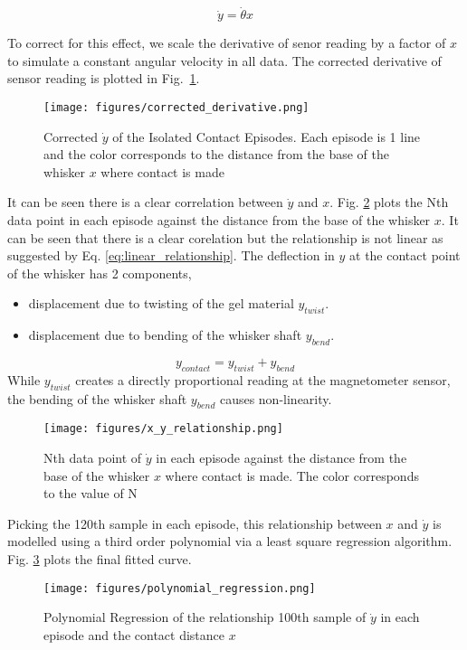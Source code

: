\documentclass{report}
\begin{document}
\[\dot{y} = \dot{\theta}x\]\label{eq:linear_relationship}

To correct for this effect, we scale the derivative of senor reading by a factor of \(x\) to simulate a constant angular velocity in all data. The corrected derivative of sensor reading is plotted in Fig.~\ref{fig:corrected_derivative.png}.

\begin{figure}[H]
    \centering
    \texttt{[image: figures/corrected\_derivative.png]}
    \caption{Corrected \(\dot{y}\) of the Isolated Contact Episodes. Each episode is 1 line and the color corresponds to the distance from the base of the whisker \(x\) where contact is made}
    \label{fig:corrected_derivative.png}
\end{figure}

It can be seen there is a clear correlation between \(\dot{y}\) and \(x\). Fig. \ref*{fig:x_y_relationship.png} plots the Nth data point in each episode against the distance from the base of the whisker \(x\). It can be seen that there is a clear corelation but the relationship is not linear as suggested by Eq. \ref*{eq:linear_relationship}. The deflection in \(y\) at the contact point of the whisker has 2 components,
\begin{itemize}
    \item displacement due to twisting of the gel material \(y_{twist}\).
    \item displacement due to bending of the whisker shaft \(y_{bend}\).
\end{itemize}
\[y_{contact} = y_{twist} + y_{bend}\]
While \(y_{twist}\) creates a directly proportional reading at the magnetometer sensor, the bending of the whisker shaft \(y_{bend}\) causes non-linearity.

\begin{figure}[H]
    \centering
    \texttt{[image: figures/x\_y\_relationship.png]}
    \caption{Nth data point of \(\dot{y}\) in each episode against the distance from the base of the whisker \(x\) where contact is made. The color corresponds to the value of N}
    \label{fig:x_y_relationship.png}
\end{figure}


Picking the 120th sample in each episode, this relationship between \(x\) and \(\dot{y}\) is modelled using a third order polynomial via a least square regression algorithm. Fig. \ref*{fig:polynomial_regression.png} plots the final fitted curve.

\begin{figure}[H]
    \centering
    \texttt{[image: figures/polynomial\_regression.png]}
    \caption{Polynomial Regression of the relationship 100th sample of \(\dot{y}\) in each episode and the contact distance \(x\)}
    \label{fig:polynomial_regression.png}
\end{figure}
\end{document}
